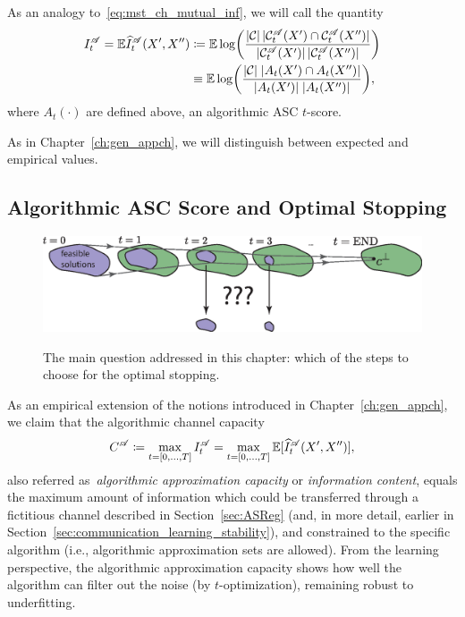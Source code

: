 \begin{definition}
As an analogy to~\eqref{eq:mst_ch_mutual_inf}, we will call the quantity
\begin{align}\label{eq:alg_eq:mst_asc_ratio}
  I_t^{\mathscr{A}} = \mathbb{E} \widehat I_t^{\mathscr{A}}( X', X'' ) 
    &\coloneqq \mathbb{E} \log\biggl( \frac{|{\cal C}| \, |{{\cal C}}^{\mathscr{A}}_{t}(X') \cap
      {{\cal C}}^{\mathscr{A}}_{t}(X'')|}{|{{\cal C}}^{\mathscr{A}}_{t}(X')|
      \, |{{\cal C}}^{\mathscr{A}}_{t}(X'')|}\biggr) \notag \\
    &\equiv \mathbb{E} \log \biggl(\frac{
      |{\cal C}|\; |A_t(X') \cap A_t(X'')|
    }{
      |A_t(X')|\; |A_t(X'')|
    }\biggr), 
\end{align}
%
%
where $A_t(\cdot)$ are defined above, an algorithmic ASC $t$-score.
\end{definition}
As in Chapter~\ref{ch:gen_appch}, we will distinguish between 
expected and empirical values.

\subsection{Algorithmic ASC Score and Optimal Stopping}
\begin{figure}[hb!]
  \centering
  \includegraphics[width=\textwidth]{figures/ch_mst/contractive_alg_opt_stop}
  \\[.5cm]
  \caption{The main question addressed in this chapter: which of the steps to
    choose for the optimal stopping.}
  \label{fig:mst_contractive_algorithm_opt_stop}
\end{figure}
As an empirical extension of the notions introduced in
Chapter~\ref{ch:gen_appch}, we claim that the algorithmic channel capacity
\begin{equation}
  C^{\mathscr{A}} \coloneqq \max_{t = [0, \ldots, T]} I^{\mathscr{A}}_{t} 
    = \max_{t = [0, \ldots, T]}\mathbb{E} [\widehat I^{\mathscr{A}}_{t}(X', X'')],
\end{equation} 
%
also referred as~\emph{algorithmic approximation capacity} or \emph{information
content}, equals the maximum amount of information which could be transferred
through a fictitious channel described in Section~\ref{sec:ASReg} (and, in more
detail, earlier in Section~\ref{sec:communication_learning_stability}), and
constrained to the specific algorithm (i.e., algorithmic approximation sets are
allowed). From the learning perspective, the algorithmic approximation capacity
shows how well the algorithm can filter out the noise (by $t$-optimization),
remaining robust to underfitting.

